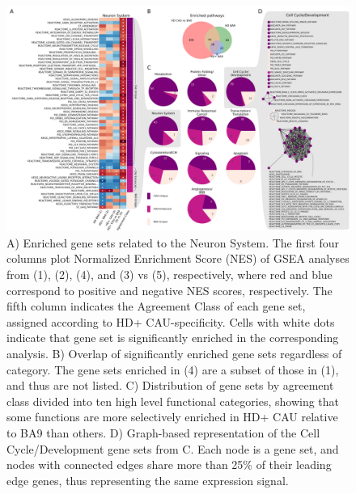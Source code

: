 \documentclass[fleqn,10pt,table]{wlscirep}
\begin{document}
\begin{figure}[ht]
\centering
\includegraphics[width=\linewidth]{bigfig_annot.png}
\caption{A) Enriched gene sets related to the Neuron System.
The first four columns plot Normalized Enrichment Score (NES) of GSEA analyses from (1), (2), (4), and (3) vs (5), respectively, where red and blue correspond to positive and negative NES scores, respectively.
The fifth column indicates the Agreement Class of each gene set, assigned according to HD+ CAU-specificity.
Cells with white dots indicate that gene set is significantly enriched in the corresponding analysis.
B) Overlap of significantly enriched gene sets regardless of category.
The gene sets enriched in (4) are a subset of those in (1), and thus are not listed.
C) Distribution of gene sets by agreement class divided into ten high level functional categories, showing that some functions are more selectively enriched in HD+ CAU relative to BA9 than others.
D) Graph-based representation of the Cell Cycle/Development gene sets from C. Each node is a gene set, and nodes with connected edges share more than 25\% of their leading edge genes, thus representing the same expression signal.\label{fig:cau_ba9_gtex}}
\end{figure}
\end{document}
